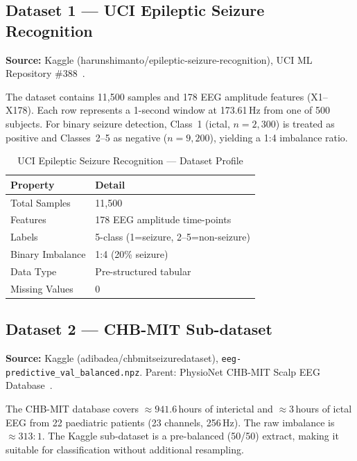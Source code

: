 \documentclass[conference]{IEEEtran}
\begin{document}
\subsection{Dataset 1 --- UCI Epileptic Seizure Recognition}

\textbf{Source:} Kaggle (harunshimanto/epileptic-seizure-recognition),
UCI ML Repository \#388~\cite{uci2001}.

The dataset contains 11{,}500 samples and 178 EEG amplitude features
(X1--X178). Each row represents a 1-second window at 173.61\,Hz from
one of 500 subjects. For binary seizure detection, Class~1 (ictal,
$n{=}2{,}300$) is treated as positive and Classes~2--5 as negative
($n{=}9{,}200$), yielding a 1:4 imbalance ratio.

\begin{table}[H]
  \centering
  \caption{UCI Epileptic Seizure Recognition --- Dataset Profile}
  \label{tab:uci}
  \begin{tabular}{ll}
    \toprule
    \textbf{Property} & \textbf{Detail} \\
    \midrule
    Total Samples     & 11{,}500 \\
    Features          & 178 EEG amplitude time-points \\
    Labels            & 5-class (1=seizure, 2--5=non-seizure) \\
    Binary Imbalance  & 1:4 (20\% seizure) \\
    Data Type         & Pre-structured tabular \\
    Missing Values    & 0 \\
    \bottomrule
  \end{tabular}
\end{table}

\subsection{Dataset 2 --- CHB-MIT Sub-dataset}

\textbf{Source:} Kaggle (adibadea/chbmitseizuredataset),
\texttt{eeg-predictive\_val\_balanced.npz}. Parent: PhysioNet CHB-MIT
Scalp EEG Database~\cite{goldberger2000,shoeb2009}.

The CHB-MIT database covers ${\approx}941.6$\,hours of interictal and
${\approx}3$\,hours of ictal EEG from 22 paediatric patients (23
channels, 256\,Hz). The raw imbalance is ${\approx}313{:}1$. The Kaggle
sub-dataset is a pre-balanced (50/50) extract, making it suitable for
classification without additional resampling.
\end{document}
